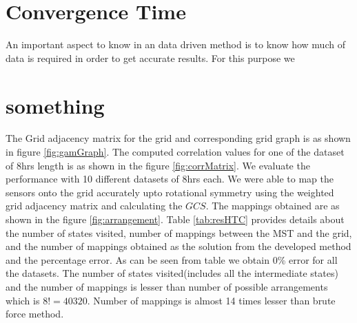 \section{Convergence Time}
An important aspect to know in an data driven method is to know how much of data is required in order to get accurate results. For this purpose we 
\section{something}
The Grid adjacency matrix for the grid and corresponding grid graph is as shown in figure \ref{fig:gamGraph}. The computed correlation values for one of the dataset of 8hrs length is as shown in the figure \ref{fig:corrMatrix}.
We evaluate the performance with 10 different datasets of 8hrs each. We were able to map the sensors onto the grid accurately upto rotational symmetry using the weighted grid adjacency matrix and calculating the $GCS$. The mappings obtained are as shown in the figure \ref{fig:arrangement}.
Table \ref{tab:resHTC} provides details about the number of states visited, number of mappings between the MST and the grid, and the number of mappings obtained as the solution from the developed method and the percentage error. As can be seen from table we obtain 0\% error for all the datasets. 
The number of states visited(includes all the intermediate states) and the number of mappings is lesser than number of possible arrangements which is $8! = 40320$. Number of mappings is almost 14 times lesser than brute force method.

